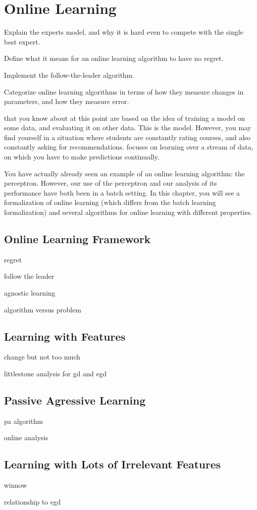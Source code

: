 
\chapter{Online Learning} \label{sec:online}


\begin{learningobjectives}
\item Explain the experts model, and why it is hard even to compete
  with the single best expert.
\item Define what it means for an online learning algorithm to have no
  regret.
\item Implement the follow-the-leader algorithm.
\item Categorize online learning algorithms in terms of how they
  measure changes in parameters, and how they measure error.
\end{learningobjectives}

\dependencies{}

 that you know about at
this point are based on the idea of training a model on some data, and
evaluating it on other data.  This is the 
model.  However, you may find yourself in a situation where students
are constantly rating courses, and also constantly asking for
recommendations.   focuses
on learning over a stream of data, on which you have to make
predictions continually.

You have actually already seen an example of an online learning
algorithm: the perceptron.  However, our use of the perceptron and our
analysis of its performance have both been in a batch setting.  In
this chapter, you will see a formalization of online learning (which
differs from the batch learning formalization) and several algorithms
for online learning with different properties.

\section{Online Learning Framework}

regret

follow the leader

agnostic learning

algorithm versus problem

\section{Learning with Features}

change but not too much

littlestone analysis for gd and egd

\section{Passive Agressive Learning}

pa algorithm

online analysis

\section{Learning with Lots of Irrelevant Features}

winnow

relationship to egd

